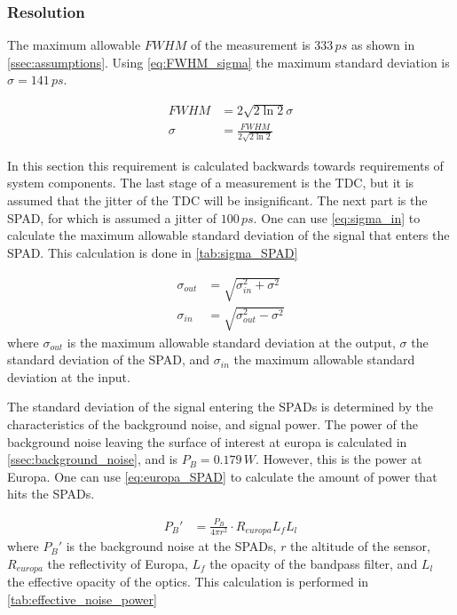 \subsubsection{Resolution} 
\label{sssec:resolution}

The maximum allowable $FWHM$ of the measurement is $333\,ps$ as shown in \cref{ssec:assumptions}. Using \cref{eq:FWHM_sigma} the maximum standard deviation is $\sigma=141\,ps$.

\begin{align}\label{eq:sigma_FWHM}
	FWHM   &= 2\sqrt{2\ln2}\sigma \\
	\sigma &= \frac{FWHM}{2\sqrt{2\ln2}}\label{eq:FWHM_sigma}
\end{align}

In this section this requirement is calculated backwards towards requirements of system components. The last stage of a measurement is the TDC, but it is assumed that the jitter of the TDC will be insignificant. The next part is the SPAD, for which is assumed a jitter of $100\,ps$. One can use \cref{eq:sigma_in} to calculate the maximum allowable standard deviation of the signal that enters the SPAD. This calculation is done in \cref{tab:sigma_SPAD}

\begin{align}\label{eq:sigma_out}
	\sigma_{out} &= \sqrt{\sigma_{in}^2+\sigma^2}\\
	\sigma_{in}  &= \sqrt{\sigma_{out}^2-\sigma^2} \label{eq:sigma_in}
\end{align}
where $\sigma_{out}$ is the maximum allowable standard deviation at the output, $\sigma$ the standard deviation of the SPAD, and $\sigma_{in}$ the maximum allowable standard deviation at the input.


The standard deviation of the signal entering the SPADs is determined by the characteristics of the background noise, and signal power. The power of the background noise leaving the surface of interest at europa is calculated in \cref{ssec:background_noise}, and is $P_B = 0.179\,W$. However, this is the power at Europa. One can use \cref{eq:europa_SPAD} to calculate the amount of power that hits the SPADs.

\begin{align}
	P_B' &= \frac{P_B}{4\pi r^2}\cdot R_{europa}L_fL_l
\end{align}
where $P_B'$ is the background noise at the SPADs, $r$ the altitude of the sensor, $R_{europa}$ the reflectivity of Europa, $L_f$ the opacity of the bandpass filter, and $L_l$ the effective opacity of the optics. This calculation is performed in \cref{tab:effective_noise_power} 

